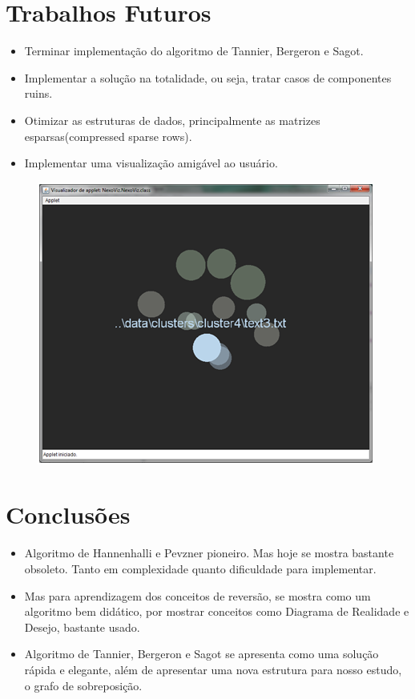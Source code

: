 \documentclass{beamer}
\begin{document}
\section{Trabalhos Futuros}
\begin{frame}
	\begin{itemize}
		\item Terminar implementação do algoritmo de Tannier, Bergeron e Sagot.
		\item Implementar a solução na totalidade, ou seja, tratar casos de componentes ruins.
		\item Otimizar as estruturas de dados, principalmente as matrizes esparsas(compressed sparse rows).
		\item Implementar uma visualização amigável ao usuário.
	\end{itemize}
	
	\begin{figure}
		\includegraphics[scale=0.5]{./imagens/img_02.png}
	\end{figure}
		
\end{frame}


\section{Conclusões}

\begin{frame}
	\begin{itemize}
		\item Algoritmo de Hannenhalli e Pevzner pioneiro. \pause Mas hoje se mostra bastante obsoleto. \pause Tanto em complexidade quanto dificuldade para implementar.
		\pause \item Mas para aprendizagem dos conceitos de reversão, se mostra como um algoritmo bem didático, por mostrar conceitos como Diagrama de Realidade e Desejo, bastante usado.
		\pause \item Algoritmo de Tannier, Bergeron e Sagot se apresenta como uma solução rápida e elegante, além de apresentar uma nova estrutura para nosso estudo, o grafo de sobreposição.
	\end{itemize}
\end{frame}

\begin{frame}[plain]
  \titlepage
\end{frame}
\end{document}
